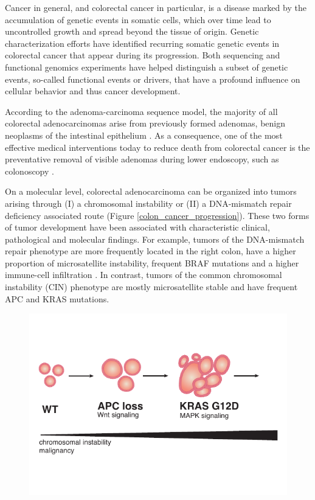 \begin{flushleft}
Cancer in general, and colorectal cancer in particular, is a disease marked by the accumulation of genetic events in somatic cells, which over time lead to uncontrolled growth and spread beyond the tissue of origin. Genetic characterization efforts have identified recurring somatic genetic events in colorectal cancer that appear during its progression. Both sequencing and functional genomics experiments have helped distinguish a subset of genetic events, so-called functional events or drivers, that have a profound influence on cellular behavior and thus cancer development. 

According to the adenoma-carcinoma sequence model, the majority of all colorectal adenocarcinomas arise from previously formed adenomas, benign neoplasms of the intestinal epithelium \cite{Cho1992}. As a consequence, one of the most effective medical interventions today to reduce death from colorectal cancer is the preventative removal of visible adenomas during lower endoscopy, such as colonoscopy \cite{Nishihara2013Long-TermEndoscopy}.\par

On a molecular level, colorectal adenocarcinoma can be organized into tumors arising through (I) a chromosomal instability or (II) a DNA-mismatch repair deficiency associated route \cite{Markowitz2009} (Figure \ref{colon_cancer_progression}). These two forms of tumor development have been associated with characteristic clinical, pathological and molecular findings. For example, tumors of the DNA-mismatch repair phenotype are more frequently located in the right colon, have a higher proportion of microsatellite instability, frequent BRAF mutations and a higher immune-cell infiltration \cite{Markowitz2009}. In contrast, tumors of the common chromosomal instability (CIN) phenotype are mostly microsatellite stable and have frequent APC and KRAS mutations. \par 


\begin{figure}[h]
\centering
\includegraphics[width=\textwidth,
                height=\textheight,
                keepaspectratio]{figures/adenomaprofiling/pdf/fig_0_0.pdf}
\caption{}
\label{fig_180}
\end{figure}
\bigbreak




\end{flushleft}
